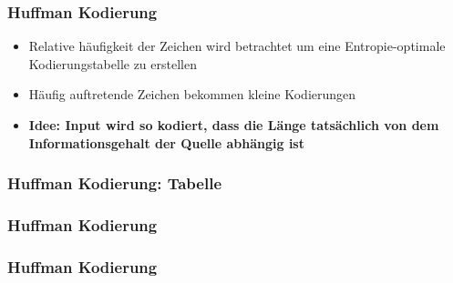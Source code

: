 \documentclass{beamer}
\begin{document}
\begin{frame}
    \frametitle{Huffman Kodierung}
    \begin{tcolorbox}[standard, title=Überblick]
        \begin{itemize}
            \item Relative häufigkeit der Zeichen wird betrachtet um eine Entropie-optimale Kodierungstabelle zu erstellen
            \item Häufig auftretende Zeichen bekommen kleine Kodierungen
            \item \textbf{Idee: Input wird so kodiert, dass die Länge tatsächlich von dem Informationsgehalt der Quelle abhängig ist}
        \end{itemize}
    \end{tcolorbox}
\end{frame}
\begin{frame}
    \frametitle{Huffman Kodierung: Tabelle}
    
\end{frame}
\begin{frame}
    \frametitle{Huffman Kodierung}
    
\end{frame}
\begin{frame}
    \frametitle{Huffman Kodierung}
    
\end{frame}
\end{document}
